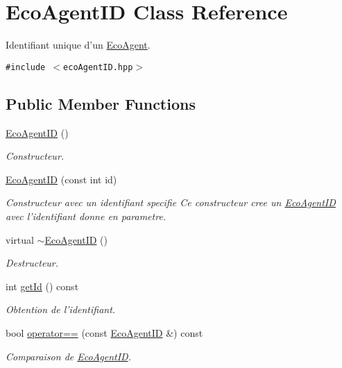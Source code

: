\hypertarget{classEcoAgentID}{
\section{EcoAgentID Class Reference}
\label{classEcoAgentID}
}
Identifiant unique d'un \hyperlink{classEcoAgent}{EcoAgent}.  


{\tt \#include $<$ecoAgentID.hpp$>$}

\subsection*{Public Member Functions}
\begin{CompactItemize}
\item 
\hyperlink{classEcoAgentID_9c337e2ad56912db99193c03d1f82c56}{EcoAgentID} ()
\begin{CompactList}\small\item\em Constructeur. \item\end{CompactList}\item 
\hyperlink{classEcoAgentID_ac86e5972be4318755f16a28c3f0d2dc}{EcoAgentID} (const int id)
\begin{CompactList}\small\item\em Constructeur avec un identifiant specifie Ce constructeur cree un \hyperlink{classEcoAgentID}{EcoAgentID} avec l'identifiant donne en parametre. \item\end{CompactList}\item 
virtual \hyperlink{classEcoAgentID_97da1c0ae8891bbf10feb0574ef64a26}{$\sim$EcoAgentID} ()
\begin{CompactList}\small\item\em Destructeur. \item\end{CompactList}\item 
int \hyperlink{classEcoAgentID_30abc8a92bd07523b8e4f4baf312b56e}{getId} () const 
\begin{CompactList}\small\item\em Obtention de l'identifiant. \item\end{CompactList}\item 
bool \hyperlink{classEcoAgentID_a6c183361e0ccdab9da2c6666d77c111}{operator==} (const \hyperlink{classEcoAgentID}{EcoAgentID} \&) const 
\begin{CompactList}\small\item\em Comparaison de \hyperlink{classEcoAgentID}{EcoAgentID}. \item\end{CompactList}\item 

\end{CompactItemize}
